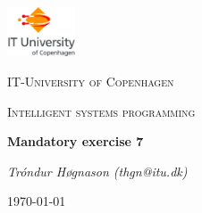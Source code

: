 
\begin{titlepage}
	\centering
	\includegraphics[width=0.15\textwidth]{logo}\par\vspace{1cm}
	{\scshape\LARGE IT-University of Copenhagen \par}
	\vspace{1cm}
	{\scshape\Large Intelligent systems programming\par}
	\vspace{1.5cm}
	{\huge\bfseries Mandatory exercise 7\par}
	\vspace{2cm}
	{\Large\itshape Tróndur Høgnason (thgn@itu.dk)\par}
\vspace{\fill}
	{\large \today\par}
\end{titlepage}